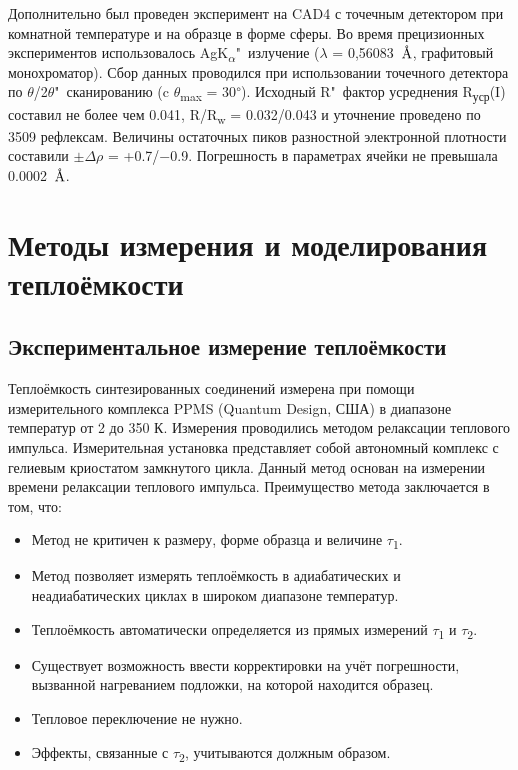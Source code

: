 Дополнительно был проведен эксперимент на CAD4 с точечным детектором при комнатной температуре и на образце в форме сферы. Во время прецизионных экспериментов использовалось AgK\textsubscript{$\alpha$}"~излучение ($\lambda$ = 0,56083~${\mbox{\normalfont\AA}}$, графитовый монохроматор). Сбор данных проводился при использовании точечного детектора по $\theta$/2$\theta$"~сканированию (c $\theta$\textsubscript{max} = 30\textsuperscript{$\circ$}).
Исходный R"~фактор усреднения R\textsubscript{уср}(I) составил не более чем  0.041, R/R\textsubscript{w} = 0.032/0.043 и уточнение проведено по 3509 рефлексам.
Величины остаточных пиков разностной электронной плотности составили $\pm\Delta$$\rho$ = +0.7/$-$0.9.
Погрешность в параметрах ячейки не превышала 0.0002~{$\mbox{\normalfont\AA}$}.

\newpage
\section{Методы измерения и моделирования теплоёмкости} \label{sect2_4}
\subsection{Экспериментальное измерение теплоёмкости}\label{sect2_4_1}
Теплоёмкость синтезированных соединений измерена при помощи измерительного комплекса PPMS (Quantum Design,
США) в диапазоне температур от 2 до 350 К. Измерения проводились методом релаксации теплового
импульса\cite{Hwang_1997}. Измерительная установка представляет собой автономный комплекс с гелиевым криостатом замкнутого цикла. Данный метод основан на измерении времени релаксации теплового импульса. Преимущество метода заключается в том, что:
\begin{itemize}
\item Метод не критичен к размеру, форме образца и величине $\tau$\textsubscript{1}.

\item Метод позволяет измерять теплоёмкость в адиабатических и неадиабатических циклах в широком диапазоне температур.

\item Теплоёмкость автоматически определяется из прямых измерений  $\tau$\textsubscript{1} и $\tau$\textsubscript{2}.

\item Существует возможность ввести корректировки на учёт погрешности, вызванной нагреванием подложки, на которой находится образец.

\item Тепловое переключение не нужно.

\item Эффекты, связанные с $\tau$\textsubscript{2}, учитываются должным образом.
\end{itemize}



